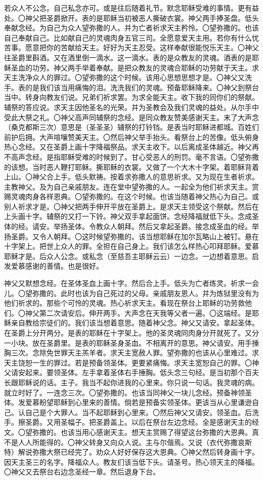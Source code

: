 \documentclass[UTF8,17pt]{ctexart}
\begin{document}
若众人不公念。自己私念亦可。或是往后随着礼节。默念耶稣受难的事情。更有益处。〇神⽗把圣爵掀开。表的是耶稣当初被恶人撕破⾐裳。神⽗两手捧圣盘。低头奉献念经。为自己为众人望弥撒的人。并为亡者祈求天主矜怜。〇望弥撒的。也该自己奉献自己。比如献自己的灵魂⾁身五官三司。全愿意爱天主⽤。若你有什么忧苦事。愿意把你的苦献给天主。好好为天主忍受。这样奉献很能悦乐天主。〇神⽗往圣爵里斟酒。又在酒里倒一滴⽔。这一滴⽔。表的是众教友的灵魂。酒表的是耶稣圣⾎的功劳。神⽗两手举着奉献。是把众教友的灵魂合耶稣的功劳献于天主。求天主洗净众人的罪过。〇望弥撒的这个时候。该⽤心思想思想才是。〇神⽗又洗手。表的是我们该当⽤痛悔的泪。洗洗我们的灵魂。预备耶稣降来。〇神⽗到祭台当中。转身向教友们说。兄弟们祈求罢。为求全能天主。收下我的同你们的祭献。辅祭的答应说。求天主因他圣名的光荣。并为圣教会及我们灵魂的益处。从尔手中受此大祭之礼。〇神父高声同辅祭的念经。是同众教友赞美感谢天主。末了大声念（桑克都斯三次）意思是（圣圣圣）辅祭的打铃铛。是表当时耶稣进都城。百姓们前护后拥。大声喧嚷赞美天主。〇然后神父举手抬头。看祭台上的苦像。低头俯身热心念经。又在圣爵上画十字降福祭品。求天主收下。以后离成圣体越近。神父再不高声念经。是指耶稣受难的时候到了。甘心受恶人的刑罚。毫不言语。〇望弥撒的该想。当时恶人鞭打耶稣。撕耶稣的衣裳。又做了一个大木十字架。着耶稣背着上山。〇神父合上手。低头默祷。按着求弥撒人的意思祈求。又为现在生者祈求。主教神父。及为自己亲戚朋友。连在堂中望弥撒的人。一起全为他们祈求天主。赏赐灵魂肉身各样恩典。〇望弥撒的。在这个时候。也该当随着神父热心为自己。或别人祈求才是。〇神父把两手伸开平放在圣爵上。是求天主领受这个祭献。然后在上头画十字。辅祭的又打一下铃。神父双手拿起面饼。念经降福就低下头。念成圣体的经。请安。举扬圣体。令教众人朝拜。然后又拿起圣爵。接念成圣血的经。举扬圣爵。又令人朝拜。〇这时候望弥撒的。该当想耶稣在加尔瓦略山上被钉。悬在十字架上。把世上众人的罪。全担在自己身上。我们该怎么样热心叩拜耶稣。爱慕耶稣才是。后众人公念。或私念（至慈吾主耶稣云云）一边念。一边想着意思。启发爱慕感谢的善情。也是很好。

神⽗又默想念经。在圣体圣⾎上画⼗字。然后合上⼿。低头为亡者炼灵。祈求⼀会⼉。〇望弥撒的。此时也该为⾃⼰死过的⽗母。亲戚朋友恩⼈。并为炼狱⾥没有为他们祈求的。那些个可怜的灵魂。热⼼祈求天主。看现在祭台上耶稣的功劳救他们。〇神⽗第⼆次请安后。伸开两⼿。⼤声念在天我等⽗者⼀遍。〇这端经。是耶稣亲⾃教给宗徒们的。我们该当想着意思。随着神⽗念。神⽗又请安。拿起圣体。在圣爵上分开两分。是表的耶稣在⼗字架上。他的圣灵魂同⾁⾝分开就死了。又分⼀⼩块。放在圣爵⾥。是表的耶稣圣⾝圣⾎。不相离开的意思。神⽗请安。⽤⼿捶胸三次。念除免世罪天主羔⽺者。求天主宽赦⼈罪。望弥撒的也该从⼼⾥难过。求天主饶恕⼀⽣的罪过。若是预备领圣体。更要紧痛悔。求天主宽恕⾃⼰的罪。〇神⽗请安起来。要领圣体。左⼿拿着圣体右⼿捶胸。低头念三句经。是当初那个百夫长跟耶稣说的话。主子。我当不起你进我的心里来。你只说一句话。我灵魂的病。就立时好了。一连念三次。〇望弥撒的。也该当同神父一块儿念经。预备神领圣体。发爱慕盼望耶稣到心里来的善情。倘若是预备实领圣体。更该当从心里谦逊自己。认自己是个大罪人。当不起耶稣到心里来。〇然后神父又请安。领圣血。后洗手。擦圣爵。又用圣幅子。把圣爵盖上。以后在祭台左边念经。全是感谢天主的经文。〇望弥撒的。也该当用心感谢天主。想天主赏赐了得望这台弥撒的大恩典。真不是人人所能得的。〇神父转身又向众人说。主与尔偕焉。又说（衣代弥撒哀斯特）解说弥撒大祭已经完了。劝众人好好保存这大恩典。〇神父然后转身画十字。因天主圣三的名字。降福众人。教友们该当低下头。请圣号。热心领天主的降福。〇神父又去祭台右边念圣经一章。然后退身下台。
\end{document}
